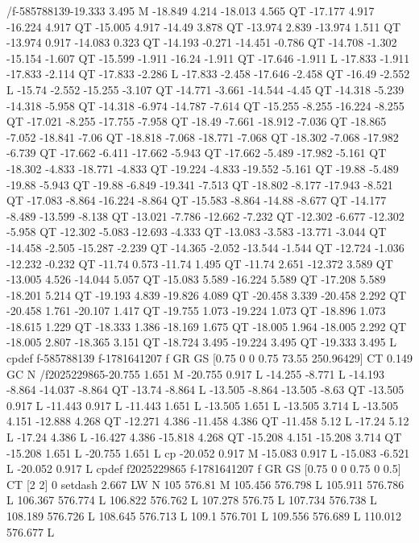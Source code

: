 /f-585788139{-19.333 3.495 M
-18.849 4.214 -18.013 4.565 QT
-17.177 4.917 -16.224 4.917 QT
-15.005 4.917 -14.49 3.878 QT
-13.974 2.839 -13.974 1.511 QT
-13.974 0.917 -14.083 0.323 QT
-14.193 -0.271 -14.451 -0.786 QT
-14.708 -1.302 -15.154 -1.607 QT
-15.599 -1.911 -16.24 -1.911 QT
-17.646 -1.911 L
-17.833 -1.911 -17.833 -2.114 QT
-17.833 -2.286 L
-17.833 -2.458 -17.646 -2.458 QT
-16.49 -2.552 L
-15.74 -2.552 -15.255 -3.107 QT
-14.771 -3.661 -14.544 -4.45 QT
-14.318 -5.239 -14.318 -5.958 QT
-14.318 -6.974 -14.787 -7.614 QT
-15.255 -8.255 -16.224 -8.255 QT
-17.021 -8.255 -17.755 -7.958 QT
-18.49 -7.661 -18.912 -7.036 QT
-18.865 -7.052 -18.841 -7.06 QT
-18.818 -7.068 -18.771 -7.068 QT
-18.302 -7.068 -17.982 -6.739 QT
-17.662 -6.411 -17.662 -5.943 QT
-17.662 -5.489 -17.982 -5.161 QT
-18.302 -4.833 -18.771 -4.833 QT
-19.224 -4.833 -19.552 -5.161 QT
-19.88 -5.489 -19.88 -5.943 QT
-19.88 -6.849 -19.341 -7.513 QT
-18.802 -8.177 -17.943 -8.521 QT
-17.083 -8.864 -16.224 -8.864 QT
-15.583 -8.864 -14.88 -8.677 QT
-14.177 -8.489 -13.599 -8.138 QT
-13.021 -7.786 -12.662 -7.232 QT
-12.302 -6.677 -12.302 -5.958 QT
-12.302 -5.083 -12.693 -4.333 QT
-13.083 -3.583 -13.771 -3.044 QT
-14.458 -2.505 -15.287 -2.239 QT
-14.365 -2.052 -13.544 -1.544 QT
-12.724 -1.036 -12.232 -0.232 QT
-11.74 0.573 -11.74 1.495 QT
-11.74 2.651 -12.372 3.589 QT
-13.005 4.526 -14.044 5.057 QT
-15.083 5.589 -16.224 5.589 QT
-17.208 5.589 -18.201 5.214 QT
-19.193 4.839 -19.826 4.089 QT
-20.458 3.339 -20.458 2.292 QT
-20.458 1.761 -20.107 1.417 QT
-19.755 1.073 -19.224 1.073 QT
-18.896 1.073 -18.615 1.229 QT
-18.333 1.386 -18.169 1.675 QT
-18.005 1.964 -18.005 2.292 QT
-18.005 2.807 -18.365 3.151 QT
-18.724 3.495 -19.224 3.495 QT
-19.333 3.495 L
cp}def
f-585788139
f-1781641207
f
GR
GS
[0.75 0 0 0.75 73.55 250.96429] CT
0.149 GC
N
/f2025229865{-20.755 1.651 M
-20.755 0.917 L
-14.255 -8.771 L
-14.193 -8.864 -14.037 -8.864 QT
-13.74 -8.864 L
-13.505 -8.864 -13.505 -8.63 QT
-13.505 0.917 L
-11.443 0.917 L
-11.443 1.651 L
-13.505 1.651 L
-13.505 3.714 L
-13.505 4.151 -12.888 4.268 QT
-12.271 4.386 -11.458 4.386 QT
-11.458 5.12 L
-17.24 5.12 L
-17.24 4.386 L
-16.427 4.386 -15.818 4.268 QT
-15.208 4.151 -15.208 3.714 QT
-15.208 1.651 L
-20.755 1.651 L
cp
-20.052 0.917 M
-15.083 0.917 L
-15.083 -6.521 L
-20.052 0.917 L
cp}def
f2025229865
f-1781641207
f
GR
GS
[0.75 0 0 0.75 0 0.5] CT
[2 2] 0 setdash
2.667 LW
N
105 576.81 M
105.456 576.798 L
105.911 576.786 L
106.367 576.774 L
106.822 576.762 L
107.278 576.75 L
107.734 576.738 L
108.189 576.726 L
108.645 576.713 L
109.1 576.701 L
109.556 576.689 L
110.012 576.677 L
